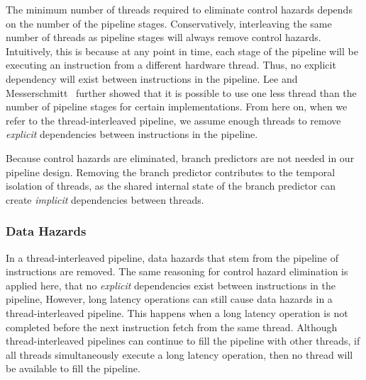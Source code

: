 The minimum number of threads required to eliminate control hazards depends on the number of the pipeline stages.
Conservatively, interleaving the same number of threads as pipeline stages will always remove control hazards.
Intuitively, this is because at any point in time, each stage of the pipeline will be executing an instruction from a different hardware thread. 
Thus, no explicit dependency will exist between instructions in the pipeline. 
Lee and Messerschmitt~\cite{lee1987pip} further showed that it is possible to use one less thread than the number of pipeline stages for certain implementations. 
From here on, when we refer to the thread-interleaved pipeline, we assume enough threads to remove \emph{explicit} dependencies between instructions in the pipeline.
	
Because control hazards are eliminated, branch predictors are not needed in our pipeline design. 
Removing the branch predictor contributes to the temporal isolation of threads, as the shared internal state of the branch predictor can create \emph{implicit} dependencies between threads.  

\subsubsection{Data Hazards}
In a thread-interleaved pipeline, data hazards that stem from the pipeline of instructions are removed.  
The same reasoning for control hazard elimination is applied here, that no \emph{explicit} dependencies exist between instructions in the pipeline, 
However, long latency operations can still cause data hazards in a thread-interleaved pipeline. 
This happens when a long latency operation is not completed before the next instruction fetch from the same thread.
Although thread-interleaved pipelines can continue to fill the pipeline with other threads, if all threads simultaneously execute a long latency operation, then no thread will be available to fill the pipeline. 

